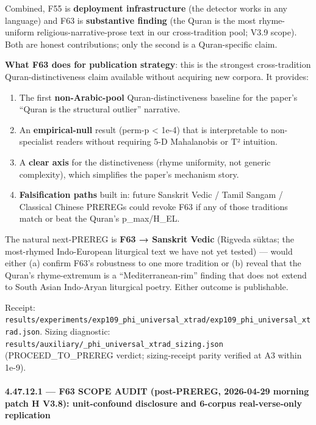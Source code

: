 \documentclass[
]{article}
\providecommand{\tightlist}{%
  \setlength{\itemsep}{0pt}\setlength{\parskip}{0pt}}
\begin{document}
Combined, F55 is \textbf{deployment infrastructure} (the detector works
in any language) and F63 is \textbf{substantive finding} (the Quran is
the most rhyme-uniform religious-narrative-prose text in our
cross-tradition pool; V3.9 scope). Both are honest contributions; only
the second is a Quran-specific claim.

\textbf{What F63 does for publication strategy}: this is the strongest
cross-tradition Quran-distinctiveness claim available without acquiring
new corpora. It provides:

\begin{enumerate}
\def\labelenumi{\arabic{enumi}.}
\tightlist
\item
  The first \textbf{non-Arabic-pool} Quran-distinctiveness baseline for
  the paper's ``Quran is the structural outlier'' narrative.
\item
  An \textbf{empirical-null} result (perm-p \textless{} 1e-4) that is
  interpretable to non-specialist readers without requiring 5-D
  Mahalanobis or T² intuition.
\item
  A \textbf{clear axis} for the distinctiveness (rhyme uniformity, not
  generic complexity), which simplifies the paper's mechanism story.
\item
  \textbf{Falsification paths} built in: future Sanskrit Vedic / Tamil
  Sangam / Classical Chinese PREREGs could revoke F63 if any of those
  traditions match or beat the Quran's p\_max/H\_EL.
\end{enumerate}

The natural next-PREREG is \textbf{F63 → Sanskrit Vedic} (Rigveda
sūktas; the most-rhymed Indo-European liturgical text we have not yet
tested) --- would either (a) confirm F63's robustness to one more
tradition or (b) reveal that the Quran's rhyme-extremum is a
``Mediterranean-rim'' finding that does not extend to South Asian
Indo-Aryan liturgical poetry. Either outcome is publishable.

Receipt:
\texttt{results/experiments/exp109\_phi\_universal\_xtrad/exp109\_phi\_universal\_xtrad.json}.
Sizing diagnostic:
\texttt{results/auxiliary/\_phi\_universal\_xtrad\_sizing.json}
(PROCEED\_TO\_PREREG verdict; sizing-receipt parity verified at A3
within 1e-9).

\paragraph{4.47.12.1 --- F63 SCOPE AUDIT (post-PREREG, 2026-04-29
morning patch H V3.8): unit-confound disclosure and 6-corpus
real-verse-only
replication}\label{f63-scope-audit-post-prereg-2026-04-29-morning-patch-h-v3.8-unit-confound-disclosure-and-6-corpus-real-verse-only-replication}
\end{document}

